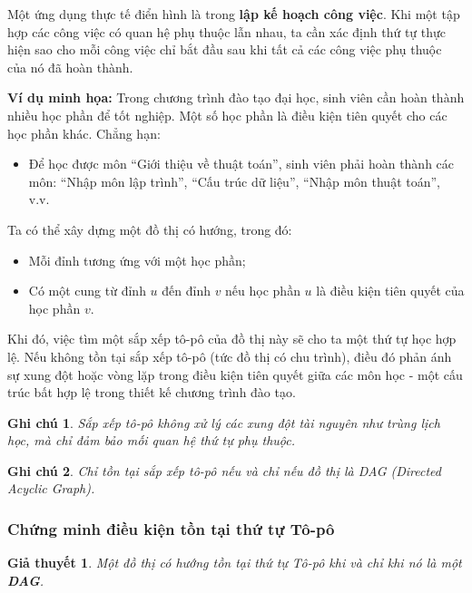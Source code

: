 \documentclass{article}
\newtheorem{ghichu}{Ghi chú}
\newtheorem{giathuyet}{Giả thuyết}
\begin{document}
Một ứng dụng thực tế điển hình là trong \textbf{lập kế hoạch công việc}. Khi một tập hợp các công việc có quan hệ phụ thuộc lẫn nhau, ta cần xác định thứ tự thực hiện sao cho mỗi công việc chỉ bắt đầu sau khi tất cả các công việc phụ thuộc của nó đã hoàn thành.

\textbf{Ví dụ minh họa:} Trong chương trình đào tạo đại học, sinh viên cần hoàn thành nhiều học phần để tốt nghiệp. Một số học phần là điều kiện tiên quyết cho các học phần khác. Chẳng hạn:
\begin{itemize}
    \item Để học được môn ``Giới thiệu về thuật toán'', sinh viên phải hoàn thành các môn: ``Nhập môn lập trình'', ``Cấu trúc dữ liệu'', ``Nhập môn thuật toán'', v.v.
\end{itemize}

Ta có thể xây dựng một đồ thị có hướng, trong đó:
\begin{itemize}
    \item Mỗi đỉnh tương ứng với một học phần;
    \item Có một cung từ đỉnh \( u \) đến đỉnh \( v \) nếu học phần \( u \) là điều kiện tiên quyết của học phần \( v \).
\end{itemize}

Khi đó, việc tìm một sắp xếp tô-pô của đồ thị này sẽ cho ta một thứ tự học hợp lệ. Nếu không tồn tại sắp xếp tô-pô (tức đồ thị có chu trình), điều đó phản ánh sự xung đột hoặc vòng lặp trong điều kiện tiên quyết giữa các môn học - một cấu trúc bất hợp lệ trong thiết kế chương trình đào tạo.

\begin{ghichu}
Sắp xếp tô-pô không xử lý các xung đột tài nguyên như trùng lịch học, mà chỉ đảm bảo mối quan hệ thứ tự phụ thuộc.
\end{ghichu}


\begin{ghichu}
Chỉ tồn tại sắp xếp tô-pô nếu và chỉ nếu đồ thị là DAG (Directed Acyclic Graph).

\end{ghichu}


\subsubsection{Chứng minh điều kiện tồn tại thứ tự Tô-pô}

\begin{giathuyet}
    Một đồ thị có hướng tồn tại thứ tự Tô-pô khi và chỉ khi nó là một \textbf{DAG}.
\end{giathuyet}
\end{document}
